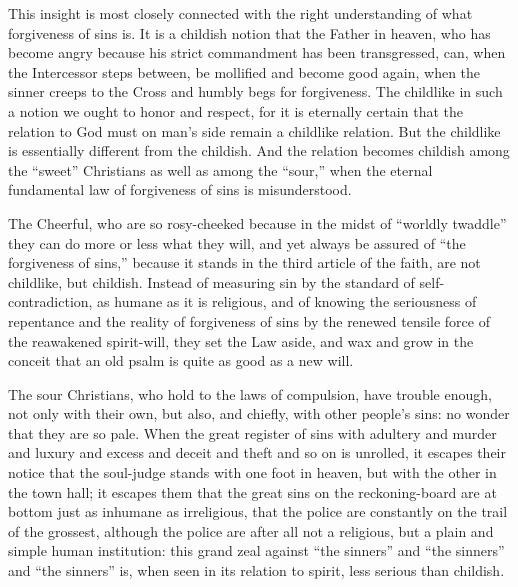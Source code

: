 \documentclass[12pt,a4paper,openany]{book}
\newcommand{\opage}[1]{\marginnote{\footnotesize\textit{[#1]}}}
\begin{document}
This insight is most closely connected
with the right understanding of what forgiveness of sins is.
It is a childish notion that the Father in heaven, who
has become angry because his strict commandment has been transgressed, can,
when the Intercessor steps between, be mollified and become good
again, when the sinner creeps to the Cross and humbly begs
for forgiveness. The childlike in such a notion we ought
to honor and respect, for it is eternally certain that the relation to God
must on man's side remain a childlike relation.
But the childlike is essentially different from the childish.
And the relation becomes childish among the
``sweet'' Christians as well as among the ``sour,'' when the eternal
fundamental law of forgiveness of sins is misunderstood.

The Cheerful, who are so rosy-cheeked because in the midst of
``worldly twaddle'' they can do more or less what they will,
and yet always be assured of ``the forgiveness of sins,''
because it stands in the third article of the faith, are not
childlike, but childish. Instead of measuring sin
by the standard of self-contradiction, as humane as it is religious,
\setcounter{footnote}{0}%
\opage{73}and of knowing the seriousness of repentance and the reality of forgiveness of sins
by the renewed tensile force of the reawakened spirit-will,
they set the Law aside, and wax and grow in the
conceit that an old psalm is quite as good as
a new will.

The sour Christians, who hold to the laws of compulsion, have
trouble enough, not only with their own, but also,
and chiefly, with other people's sins: no wonder
that they are so pale. When the great register of sins with
adultery and murder and luxury and excess and deceit and
theft and so on is unrolled, it escapes their notice
that the soul-judge stands with one foot in heaven,
but with the other in the town hall; it escapes them
that the great sins on the reckoning-board are at bottom just as
inhumane as irreligious, that the police are constantly on the
trail of the grossest, although the police are after all not a
religious, but a plain and simple human institution: this
grand zeal against ``the sinners'' and ``the sinners'' and ``the sinners''
is, when seen in its relation to spirit, less
serious than childish.
\end{document}
